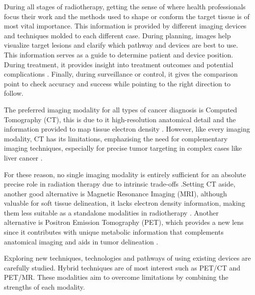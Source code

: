 

During all stages of radiotherapy, getting the sense of where health professionals focus their work and the methods used to shape or conform the target tissue is of most vital importance. This information is provided by different imaging devices and techniques molded to each different case. During planning, images help visualize target lesions and clarify which pathway and devices are best to use. This information serves as a guide to determine patient and device position. During treatment, it provides insight into treatment outcomes and potential complications \cite{decazes2021}. Finally, during surveillance or control, it gives the comparison point to check accuracy and success while pointing to the right direction to follow.

The preferred imaging modality for all types of cancer diagnosis is Computed Tomography (CT), this is due to it high-resolution anatomical detail and the information provided to map tissue electron density \cite{decazes2021,yan2024}. However, like every imaging modality, CT has its limitations, emphazising the need for complementary imaging techniques, especially for precise tumor targeting in complex cases like liver cancer \cite{yan2024}.

For these reason, no single imaging modality is entirely sufficient for an absolute precise role in radiation therapy due to intrinsic trade-offs \cite{decazes2021}.Setting CT aside, another good alternative is Magnetic Resonance Imaging (MRI), although valuable for soft tissue delineation, it lacks electron density information, making them less suitable as a standalone modalities in radiotherapy \cite{decazes2021}. Another alternative is Positron Emission Tomography (PET), which provides a new lens since it contributes with unique metabolic information that complements anatomical imaging and aids in tumor delineation \cite{decazes2021}.

Exploring new techniques, technologies and pathways of using existing devices are carefully studied. Hybrid techniques are of most interest such as PET/CT and PET/MR. These modalities aim to overcome limitations by combining the strengths of each modality.

